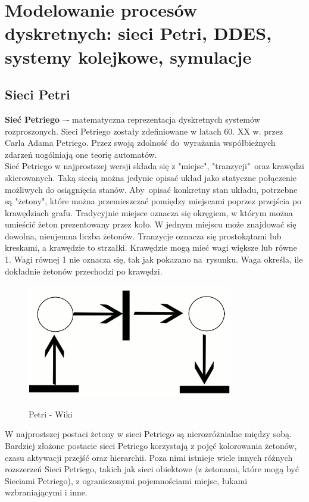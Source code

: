 \documentclass[10pt, a
4paper]{article}
\begin{document}
\newpage
\section{Modelowanie procesów dyskretnych: sieci Petri, DDES, systemy kolejkowe, symulacje}

\subsection{Sieci Petri}
\textbf{Sieć Petriego} –- matematyczna reprezentacja dyskretnych systemów rozproszonych. Sieci Petriego zostały zdefiniowane w latach 60. XX w. przez Carla Adama Petriego. Przez swoją zdolność do~wyrażania współbieżnych zdarzeń uogólniają one teorię automatów.\\

Sieć Petriego w najprostszej wersji składa się z "miejsc", "tranzycji"\ oraz krawędzi skierowanych. Taką siecią można jedynie opisać układ jako statyczne połączenie możliwych do osiągnięcia stanów. Aby~opisać konkretny stan układu, potrzebne są "żetony", które można przemieszczać pomiędzy miejscami poprzez przejścia po krawędziach grafu. Tradycyjnie miejsce oznacza się okręgiem, w którym można umieścić żeton prezentowany przez koło. W jednym miejscu może znajdować się dowolna, nieujemna liczba żetonów. Tranzycje oznacza się prostokątami lub kreskami, a krawędzie to strzałki. Krawędzie mogą mieć wagi większe lub równe 1. Wagi równej 1 nie oznacza się, tak jak pokazano na~rysunku. Waga określa, ile dokładnie żetonów przechodzi po krawędzi.
\begin{figure}[H]
\begin{center}
\label{diagram}
\includegraphics[scale = 1]{Rysunki/Petri.png}
\caption{Petri - Wiki}
\end{center}
\end{figure}

W najprostszej postaci żetony w sieci Petriego są nierozróżnialne między sobą. Bardziej złożone postacie sieci Petriego korzystają z pojęć kolorowania żetonów, czasu aktywacji przejść oraz hierarchii. Poza nimi istnieje wiele innych różnych rozszerzeń Sieci Petriego, takich jak sieci obiektowe (z żetonami, które mogą być Sieciami Petriego), z ograniczonymi pojemnościami miejsc, łukami wzbraniającymi i inne.\\
\end{document}
